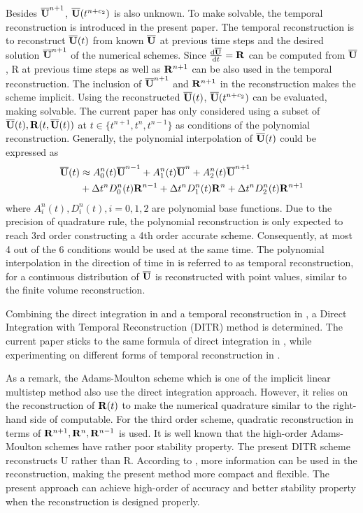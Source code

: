 \documentclass[preprint,12pt]{elsarticle}
\begin{document}
Besides $\overline{\mathbf{U}}^{n+1}$, $\overline{\mathbf{U}}(t^{n+c_2})$ is also unknown. 
To make 
solvable, the temporal reconstruction is introduced in the
present paper. 
The temporal reconstruction is to reconstruct $\overline{\mathbf{U}}(t)$
from known $\overline{\mathbf{U}}$ at previous time steps and the desired
solution $\overline{\mathbf{U}}^{n+1}$ of the numerical schemes. Since $\frac{\dd\overline{\mathbf{U}}}{\dd t}=\mathbf{R}$
can be computed from  $\overline{\mathbf{U}}$, R at previous time steps as well
as  $\mathbf{R}^{n+1}$ can be also used in the temporal reconstruction. 
The inclusion of $\overline{\mathbf{U}}^{n+1}$ and $\mathbf{R}^{n+1}$ in the reconstruction
makes the scheme implicit. 
Using the reconstructed $\overline{\mathbf{U}}(t)$, $\overline{\mathbf{U}}(t^{n+c_2})$
can be evaluated, making  solvable.
The current paper has only considered using a subset of
$\overline{\mathbf{U}}(t), \mathbf{R}(t, \overline{\mathbf{U}}(t))$ at $t \in \{t^{n+1}, t^n, t^{n-1}\}$
as conditions of the polynomial reconstruction.
Generally, the polynomial interpolation
of $\overline{\mathbf{U}}(t)$ could be expressed as
\begin{equation}
    \begin{aligned} 
        \label{eq:TR}
        \overline{\mathbf{U}}(t) & \approx
        A^n_0(t)\overline{\mathbf{U}}^{n - 1} +
        A^n_1(t)\overline{\mathbf{U}}^{n} +
        A^n_2(t)\overline{\mathbf{U}}^{n + 1}
        \\ & +
        \mathrm\Delta t^n D^n_0(t)\mathbf{R}^{n - 1} +
        \mathrm\Delta t^n D^n_1(t)\mathbf{R}^{n} +
        \mathrm\Delta t^n D^n_2(t)\mathbf{R}^{n + 1}
    \end{aligned}
\end{equation}
where $A^n_i(t), D^n_i(t), i=0,1,2$
are polynomial base functions. Due to the precision of quadrature rule,
the polynomial reconstruction is only expected to reach 3rd order
constructing a 4th order accurate scheme. 
Consequently, at most 4 out of the
6 conditions would be used at the same time.
The polynomial interpolation in the direction of time in 
is referred to as temporal reconstruction, for
a continuous distribution of $\overline{\mathbf{U}}$ is reconstructed with point values,
similar to the finite volume reconstruction.

Combining the direct integration in 
and a  temporal reconstruction in ,
a Direct Integration with Temporal Reconstruction (DITR) method is
determined.
The current paper sticks to the same formula of direct integration
in , while experimenting on different
forms of temporal reconstruction in .

As a remark, the Adams-Moulton scheme which is one of the
implicit linear multistep method also use the direct
integration approach. 
However, it relies on the
reconstruction of $\mathbf{R}(t)$ to make the numerical quadrature
similar to the right-hand side of  computable. 
For the third order scheme, quadratic reconstruction in terms
of $\mathbf{R}^{n+1},\mathbf{R}^{n},\mathbf{R}^{n-1}$ is used. 
It is well known that the high-order
Adams-Moulton schemes have rather poor stability
property. The present DITR scheme reconstructs U rather
than R. According to , 
more information can be used
in the reconstruction, making the present method more
compact and flexible. The present approach can achieve
high-order of accuracy and better stability property when
the reconstruction is designed properly.
\end{document}
